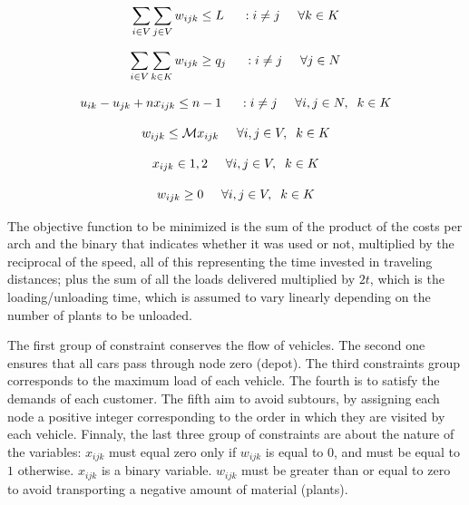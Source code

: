 \documentclass{amsart}
\begin{document}
        $$ \sum_{i \in V} \sum_{j \in V} w_{ijk} \leq L \hspace{0.5cm} : i \neq j \hspace{0.5cm} \forall k \in K$$

        $$ \sum_{i \in V} \sum_{k \in K} w_{ijk} \geq q_j \hspace{0.5cm} : i \neq j \hspace{0.5cm} \forall j \in N$$

        $$u_{ik} - u_{jk} + n x_{ijk} \leq n - 1 \hspace{0.5cm} : i \neq j \hspace{0.5cm} \forall i,j \in N, \hspace{0.2cm} k \in K$$

        $$w_{ijk} \leq \mathcal{M} x_{ijk} \hspace{0.5cm} \forall i,j \in V, \hspace{0.2cm} k \in K$$

        $$x_{ijk} \in {1, 2} \hspace{0.5cm} \forall i,j \in V, \hspace{0.2cm} k \in K$$
        
        $$w_{ijk} \geq 0 \hspace{0.5cm} \forall i,j \in V, \hspace{0.2cm} k \in K$$
        
        
\vspace{0.4cm}
        The objective function to be minimized is the sum of the product of the costs per arch and the binary that indicates whether it was used or not, multiplied by the reciprocal of the speed, all of this representing the time invested in traveling distances; plus the sum of all the loads delivered multiplied by $2t$, which is the loading/unloading time, which is assumed to vary linearly depending on the number of plants to be unloaded. 
        
        
        The first group of constraint conserves the flow of vehicles. The second one ensures that all cars pass through node zero (depot). The third constraints group corresponds to the maximum load of each vehicle. The fourth is to satisfy the demands of each customer. The fifth aim to avoid subtours, by assigning each node a positive integer corresponding to the order in which they are visited by each vehicle. Finnaly, the last three group of constraints are about the nature of the variables: $x_{ijk}$ must equal zero only if $w_{ijk}$ is equal to $0$, and must be equal to $1$ otherwise. $x_{ijk}$ is a binary variable. $w_{ijk}$ must be greater than or equal to zero to avoid transporting a negative amount of material (plants).
\end{document}
